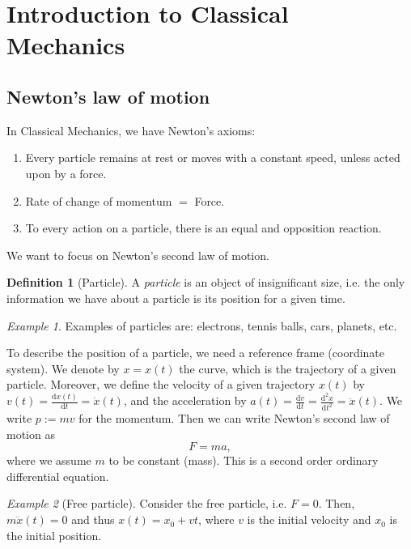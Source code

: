 \documentclass[11pt]{amsart}
\numberwithin{equation}{section}
\theoremstyle{plain}
\theoremstyle{definition}
\newtheorem{defn}{Definition}[subsection]
\theoremstyle{remark}
\newtheorem{ex}{Example}[subsection]
\newcommand{\dd}{{\mathrm{d}}}
\begin{document}



\section{Introduction to Classical Mechanics}
\subsection{Newton's law of motion} In Classical Mechanics, we have Newton's axioms:
\begin{enumerate}
\item{Every particle remains at rest or moves with a constant speed, unless acted upon by a force.}
\item{Rate of change of momentum $=$ Force.}
\item{To every action on a particle, there is an equal and opposition reaction.}
\end{enumerate}

We want to focus on Newton's second law of motion. 
\begin{defn}[Particle]
A \emph{particle} is an object of insignificant size, i.e. the only information we have about a particle is its position for a given time.
\end{defn}
\begin{ex}
Examples of particles are: electrons, tennis balls, cars, planets, etc.
\end{ex}

To describe the position of a particle, we need a reference frame (coordinate system). We denote by $x=x(t)$ the curve, which is the trajectory of a given particle. Moreover, we define the velocity of a given trajectory $x(t)$ by $v(t)=\frac{\dd x(t)}{\dd t}=\dot{x}(t)$, and the acceleration by $a(t)=\frac{\dd v}{\dd t}=\frac{\dd^2x}{\dd t^2}=\ddot{x}(t)$. We write $p:=mv$ for the momentum. Then we can write Newton's second law of motion as 
\begin{equation}
\label{second_law}
F=ma,
\end{equation}
where we assume $m$ to be constant (mass). This is a second order ordinary differential equation. 

\begin{ex}[Free particle]
Consider the free particle, i.e. $F=0$. Then, $m\ddot{x}(t)=0$ and thus $x(t)=x_0+v t$, where $v$ is the initial velocity and $x_0$ is the initial position.
\end{ex}
\end{document}
